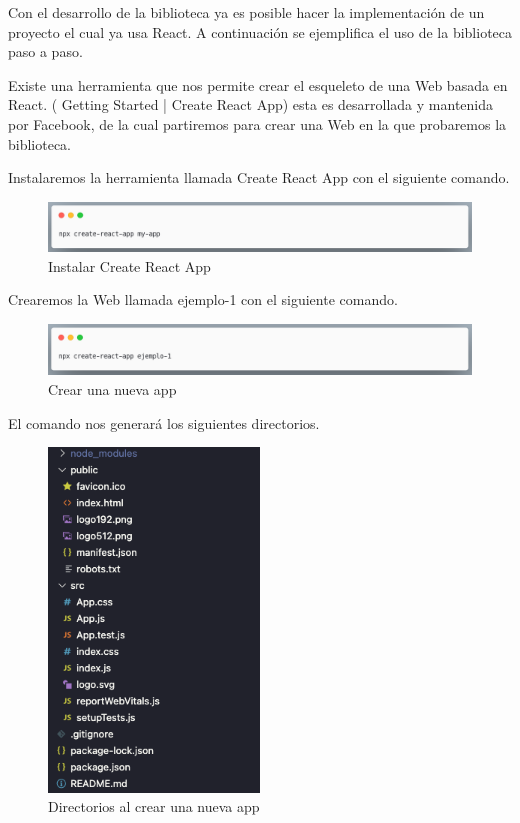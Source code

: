 Con el desarrollo de la biblioteca ya es posible hacer la implementación de un proyecto el cual ya usa React.
A continuación se ejemplifica el uso de la biblioteca paso a paso.

Existe una herramienta que nos permite crear el esqueleto de una Web basada en React. \cite{CRA}  ( Getting Started | Create React App) esta es desarrollada y mantenida por Facebook, de la cual partiremos para crear una Web en la que probaremos la biblioteca.

Instalaremos la herramienta llamada Create React App con el siguiente comando.
\newline
\begin{figure}[H]
    \includegraphics[width=1\textwidth]{./Imagenes/9.1.png}
    \caption[Instalar Create React App]{Instalar Create React App}
    \end{figure}
\newline

Crearemos la Web llamada ejemplo-1 con el siguiente comando.
\newline
\begin{figure}[H]
    \includegraphics[width=1\textwidth]{./Imagenes/9.2.png}
    \caption[Crear una nueva app]{Crear una nueva app}
    \end{figure}
\newline

El comando nos generará los siguientes directorios.
\newline
\begin{figure}[H]
    \includegraphics[width=0.5\textwidth]{./Imagenes/9.3.png}
   \centering 
    \caption[Directorios al crear una nueva app]{Directorios al crear una nueva app}
    \end{figure}
\newline

